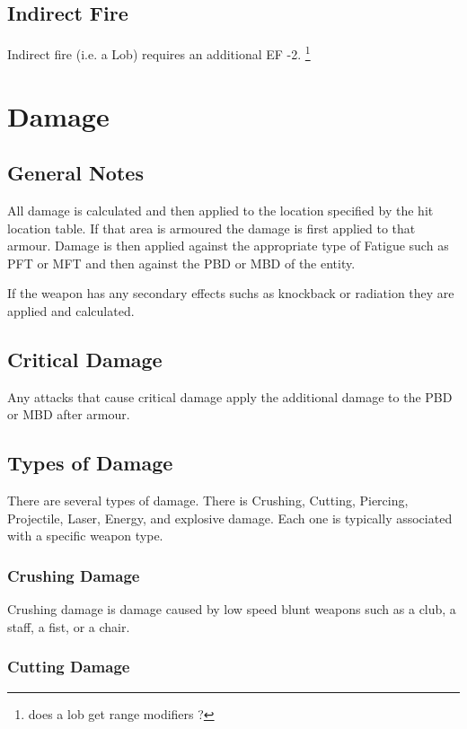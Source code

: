 \subsection{Indirect Fire}

Indirect fire (i.e. a Lob) requires an additional EF -2. 
\footnote{does a lob get range modifiers ?}


\section{Damage}

\subsection{General Notes}

All damage is calculated and then applied to the location specified 
by the hit location table. If that area is armoured the damage is 
first applied to that armour. Damage is then applied against the 
appropriate type of Fatigue such as PFT or MFT and then against the 
PBD or MBD of the entity. 

If the weapon has any secondary effects suchs as knockback or radiation
they are applied and calculated. 

\subsection{Critical Damage}

Any attacks that cause critical damage apply the additional damage to 
the PBD or MBD after armour.

\subsection{Types of Damage}

There are several types of damage. There is Crushing, Cutting, 
Piercing, Projectile, Laser, Energy, and explosive damage. Each one 
is typically associated with a specific weapon type. 

\subsubsection{Crushing Damage}

Crushing damage is damage caused by low speed blunt weapons such as 
a club, a staff, a fist, or a chair. 

\subsubsection{Cutting Damage}

